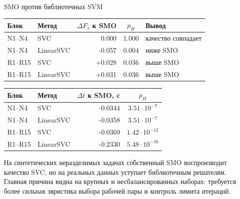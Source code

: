 \SPBGContentSlide
  {SMO против библиотечных SVM}
  {%
    \centering
    \TinyBody
    \renewcommand{\arraystretch}{1.12}
    \setlength{\tabcolsep}{4pt}
    \begin{tabular}{|l|l|r|c|l|}
      \hline
      \textbf{Блок} & \textbf{Метод} & \textbf{$\Delta F_1$ к SMO} & \textbf{$p_H$} & \textbf{Вывод} \\
      \hline
      N1--N4 & SVC & 0.000 & 1.000 & качество совпадает \\
      \hline
      N1--N4 & LinearSVC & -0.057 & 0.004 & ниже SMO \\
      \hline
      R1--R15 & SVC & +0.028 & 0.036 & выше SMO \\
      \hline
      R1--R15 & LinearSVC & +0.031 & 0.036 & выше SMO \\
      \hline
    \end{tabular}

    \vspace{.16cm}
    \begin{tabular}{|l|l|r|c|}
      \hline
      \textbf{Блок} & \textbf{Метод} & \textbf{$\Delta t$ к SMO, c} & \textbf{$p_H$} \\
      \hline
      N1--N4 & SVC & -0.0344 & $3.51\cdot10^{-7}$ \\
      \hline
      N1--N4 & LinearSVC & -0.0358 & $3.51\cdot10^{-7}$ \\
      \hline
      R1--R15 & SVC & -0.0369 & $1.42\cdot10^{-12}$ \\
      \hline
      R1--R15 & LinearSVC & -0.2330 & $5.48\cdot10^{-16}$ \\
      \hline
    \end{tabular}

    \vspace{.16cm}
    \begin{minipage}{.90\linewidth}
      \SmallBody
      \raggedright
      На синтетических неразделимых задачах собственный SMO воспроизводит
      качество SVC, но на реальных данных уступает библиотечным решателям.
      Главная причина видна на крупных и несбалансированных наборах: требуется
      более сильная эвристика выбора рабочей пары и контроль лимита итераций.
    \end{minipage}
  }
